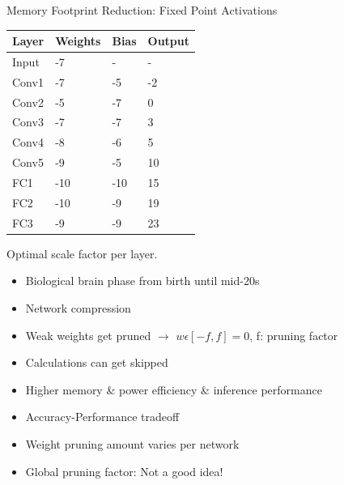 \begin{frame}{Memory Footprint Reduction: Fixed Point Activations}
	\begin{minipage}{0.6\textwidth}
		\centering
		\begin{table}
			\centering
			\begin{tabular}{llll}
				\toprule
				\textbf{Layer} & \textbf{Weights} & \textbf{Bias} & \textbf{Output} \\
				\midrule
				Input          & -7               & -             & -               \\
				Conv1          & -7               & -5            & -2              \\
				Conv2          & -5               & -7            & 0               \\
				Conv3          & -7               & -7            & 3               \\
				Conv4          & -8               & -6            & 5               \\
				Conv5          & -9               & -5            & 10              \\
				FC1            & -10              & -10           & 15              \\
				FC2            & -10              & -9            & 19              \\
				FC3            & -9               & -9            & 23              \\
				\bottomrule
			\end{tabular}
		\end{table}
	\end{minipage}%
	\begin{minipage}{0.4\textwidth}
		\large{Optimal scale factor per layer.}
	\end{minipage}
\end{frame}

\begin{frame}
	\begin{itemize}
		\item Biological brain phase from birth until mid-20s
		\item Network compression
		\item Weak weights get pruned $\rightarrow$ $w \epsilon [-f, f] = 0$, f: pruning factor
		\item Calculations can get skipped
		\item Higher memory \& power efficiency \& inference performance
		\item Accuracy-Performance tradeoff
		\item Weight pruning amount varies per network
		\item Global pruning factor: Not a good idea!
	\end{itemize}
\end{frame}

